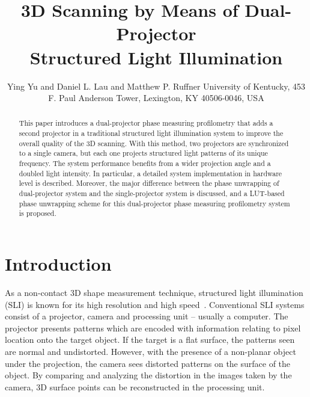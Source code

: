 \documentclass[]{spie}  %
\title{3D Scanning by Means of Dual-Projector \\ Structured Light Illumination}
\author{Ying Yu\supit{a} and Daniel L. Lau\supit{a} and Matthew P. Ruffner\supit{a}
\skiplinehalf
\supit{a}University of Kentucky, 453 F. Paul Anderson Tower, Lexington, KY 40506-0046, USA
}
\begin{document}
 
  \maketitle 

\begin{abstract}
This paper introduces a dual-projector phase measuring profilometry that adds a second projector in a traditional structured light illumination system to improve the overall quality of the 3D scanning. With this method, two projectors are synchronized to a single camera, but each one projects structured light patterns of its unique frequency. The system performance benefits from a wider projection angle and a doubled light intensity. In particular, a detailed system implementation in hardware level is described. Moreover, the major difference between the phase unwrapping of dual-projector system and the single-projector system is discussed, and a LUT-based phase unwrapping scheme for this dual-projector phase measuring profilometry system is proposed. 
\end{abstract}



\section{Introduction}
\label{sec:intro}  %
As a non-contact 3D shape measurement technique, structured light illumination (SLI) is known for its high resolution and high speed~\cite{chen00}. Conventional SLI systems consist of a projector, camera and processing unit -- usually a computer. The projector presents patterns which are encoded with information relating to pixel location onto the target object. If the target is a flat surface, the patterns seen are normal and undistorted. However, with the presence of a non-planar object under the projection, the camera sees distorted patterns on the surface of the object. By comparing and analyzing the distortion in the images taken by the camera, 3D surface points can be reconstructed in the processing unit.
\end{document}
